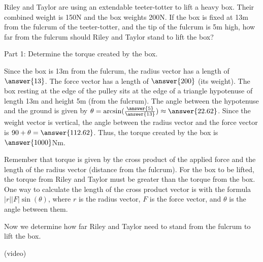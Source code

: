 \documentclass{ximera}
\begin{document}
\begin{problem}
    Riley and Taylor are using an extendable teeter-totter to lift a heavy box. Their combined weight is 150N and the box weights 200N. If the box is fixed at 13m from the fulcrum of the teeter-totter, and the tip of the fulcrum is 5m high, how far from the fulcrum should Riley and Taylor stand to lift the box?

    Part 1: Determine the torque created by the box.

    Since the box is 13m from the fulcrum, the radius vector has a length of $\answer{13}$. The force vector has a length of $\answer{200}$ (its weight). 
    The box resting at the edge of the pulley sits at the edge of a triangle hypotenuse of length 13m and height 5m (from the fulcrum). The angle between the hypotenuse and the ground is given by $\theta=\arcsin(\frac{\answer{5}}{\answer{13}})\approx \answer{22.62}$. Since the weight vector is vertical, the angle between the radius vector and the force vector is $90+\theta=\answer{112.62}$.
    Thus, the torque created by the box is $\answer{1000}$Nm.
    \begin{feedback}
        Remember that torque is given by the cross product of the applied force and the length of the radius vector (distance from the fulcrum). For the box to be lifted, the torque from Riley and Taylor must be greater than the torque from the box. One way to calculate the length of the cross product vector is with the formula $|r||F|\sin(\theta)$, where $r$ is the radius vector, $F$ is the force vector, and $\theta$ is the angle between them.
    \end{feedback}
\end{problem}

Now we determine how far Riley and Taylor need to stand from the fulcrum to lift the box.

(video)
\end{document}
